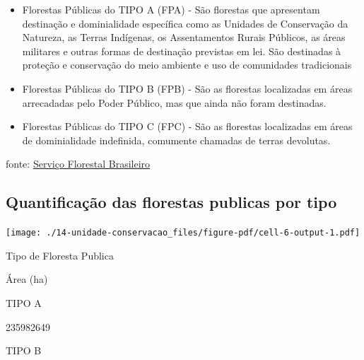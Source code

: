 \documentclass[
  letterpaper,
]{report}
\providecommand{\tightlist}{%
  \setlength{\itemsep}{0pt}\setlength{\parskip}{0pt}}\usepackage{longtable,booktabs,array}
\begin{document}
\begin{itemize}
\tightlist
\item
  Florestas Públicas do TIPO A (FPA) - São florestas que apresentam
  destinação e dominialidade específica como as Unidades de Conservação
  da Natureza, as Terras Indígenas, os Assentamentos Rurais Públicos, as
  áreas militares e outras formas de destinação previstas em lei. São
  destinadas à proteção e conservação do meio ambiente e uso de
  comunidades tradicionais
\item
  Florestas Públicas do TIPO B (FPB) - São as florestas localizadas em
  áreas arrecadadas pelo Poder Público, mas que ainda não foram
  destinadas.
\item
  Florestas Públicas do TIPO C (FPC) - São as florestas localizadas em
  áreas de dominialidade indefinida, comumente chamadas de terras
  devolutas.
\end{itemize}

fonte:
\href{https://www.gov.br/agricultura/pt-br/assuntos/servico-florestal-brasileiro/cadastro-nacional-de-florestas-publicas}{Serviço
Florestal Brasileiro}

\hypertarget{quantificauxe7uxe3o-das-florestas-publicas-por-tipo}{%
\subsection{Quantificação das florestas publicas por
tipo}\label{quantificauxe7uxe3o-das-florestas-publicas-por-tipo}}

\texttt{[image: ./14-unidade-conservacao\_files/figure-pdf/cell-6-output-1.pdf]}

\n  

\n    

\n      

Tipo de Floresta Publica

\n      

Área (ha)

\n    

\n  

\n  

\n    

\n      

TIPO A

\n      

235982649

\n    

\n    

\n      

TIPO B

\n      
\end{document}

